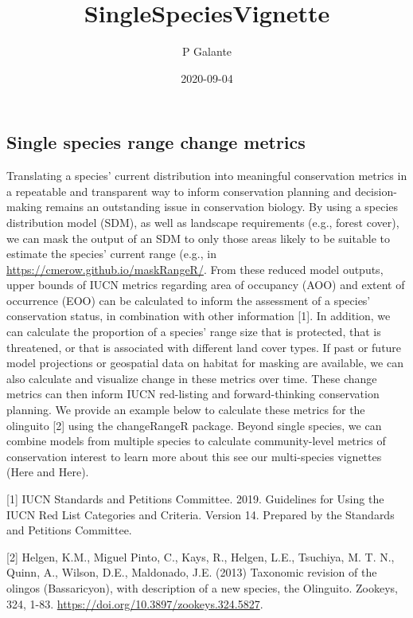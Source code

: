 \documentclass[
]{article}
\title{SingleSpeciesVignette}
\author{P Galante}
\date{2020-09-04}
\begin{document}
\maketitle

\hypertarget{single-species-range-change-metrics}{%
\subsection{Single species range change
metrics}\label{single-species-range-change-metrics}}

Translating a species' current distribution into meaningful conservation
metrics in a repeatable and transparent way to inform conservation
planning and decision-making remains an outstanding issue in
conservation biology. By using a species distribution model (SDM), as
well as landscape requirements (e.g., forest cover), we can mask the
output of an SDM to only those areas likely to be suitable to estimate
the species' current range (e.g., in
\href{maskRangeR}{https://cmerow.github.io/maskRangeR/}. From these
reduced model outputs, upper bounds of IUCN metrics regarding area of
occupancy (AOO) and extent of occurrence (EOO) can be calculated to
inform the assessment of a species' conservation status, in combination
with other information {[}1{]}. In addition, we can calculate the
proportion of a species' range size that is protected, that is
threatened, or that is associated with different land cover types. If
past or future model projections or geospatial data on habitat for
masking are available, we can also calculate and visualize change in
these metrics over time. These change metrics can then inform IUCN
red-listing and forward-thinking conservation planning. We provide an
example below to calculate these metrics for the olinguito {[}2{]} using
the changeRangeR package. Beyond single species, we can combine models
from multiple species to calculate community-level metrics of
conservation interest to learn more about this see our multi-species
vignettes (Here and Here).

{[}1{]} IUCN Standards and Petitions Committee. 2019. Guidelines for
Using the IUCN Red List Categories and Criteria. Version 14. Prepared by
the Standards and Petitions Committee.

{[}2{]} Helgen, K.M., Miguel Pinto, C., Kays, R., Helgen, L.E.,
Tsuchiya, M. T. N., Quinn, A., Wilson, D.E., Maldonado, J.E. (2013)
Taxonomic revision of the olingos (Bassaricyon), with description of a
new species, the Olinguito. Zookeys, 324, 1-83.
\url{https://doi.org/10.3897/zookeys.324.5827}.
\end{document}
